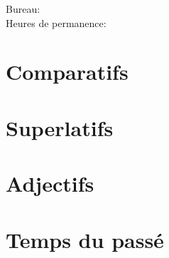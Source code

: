 \documentclass{beamer}
\subtitle[Révision]{La révision des chapitres 3 et 4}
\begin{document}
  \begin{frame}
    \titlepage
    \tiny{Bureau: \\
          Heures de permanence: }
  \end{frame}

  \begin{frame}
    \hypertarget{début}{}
    \tableofcontents[hideallsubsections]
  \end{frame}

  \section{Comparatifs}
  \section{Superlatifs}
  \section{Adjectifs}
  \section{Temps du passé}
\end{document}
